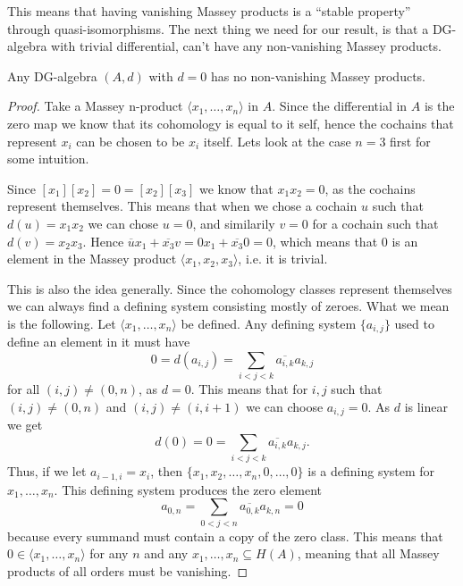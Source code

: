 This means that having vanishing Massey products is a ``stable property'' through quasi-isomorphisms. The next thing we need for our result, is that a DG-algebra with trivial differential, can't have any non-vanishing Massey products. 

\begin{lemma}
\label{lm:trivial_differential_then_no_massey}
Any DG-algebra $(A, d)$ with $d=0$ has no non-vanishing Massey products.
\end{lemma}

\begin{proof}
Take a Massey n-product $\langle x_1, \ldots, x_n\rangle$ in $A$. Since the differential in $A$ is the zero map we know that its cohomology is equal to it self, hence the cochains that represent $x_i$ can be chosen to be $x_i$ itself. Lets look at the case $n=3$ first for some intuition. 

Since $[x_1][x_2]=0=[x_2][x_3]$ we know that $x_1 x_2 =0$, as the cochains represent themselves. This means that when we chose a cochain $u$ such that $d(u)=x_1 x_2$ we can chose $u=0$, and similarily $v=0$ for a cochain such that $d(v)=x_2 x_3$. Hence $\overline{u}x_1+\overline{x_3}v = 0x_1+\overline{x_3}0=0$, which means that $0$ is an element in the Massey product $\langle x_1, x_2, x_3\rangle$, i.e. it is trivial. 

This is also the idea generally. Since the cohomology classes represent themselves we can always find a defining system consisting mostly of zeroes. What we mean is the following. Let $\langle x_1, \ldots, x_n\rangle$ be defined. Any defining system $\{a_{i,j}\}$ used to define an element in it must have 
\begin{equation*}
    0 = d(a_{i,j}) = \sum_{i<j<k}\overline{a_{i,k}} a_{k,j}
\end{equation*}
for all $(i,j)\neq (0,n)$, as $d=0$. This means that for $i,j$ such that $(i,j)\neq (0,n)$ and $(i,j)\neq (i,i+1)$ we can choose $a_{i,j} = 0$. As $d$ is linear we get
\begin{equation*}
    d(0)=0=\sum_{i<j<k}\overline{a_{i,k}} a_{k,j}.
\end{equation*}
Thus, if we let $a_{i-1, i} = x_i$, then $\{ x_1, x_2,\ldots, x_n, 0, \ldots, 0 \}$ is a defining system for $x_1, \ldots, x_n$. This defining system produces the zero element
\begin{equation*}
    a_{0,n} = \sum_{0<j<n}\overline{a_{0,k}} a_{k,n} = 0
\end{equation*}
because every summand must contain a copy of the zero class. This means that $0\in \langle x_1, \ldots, x_n\rangle$ for any $n$ and any $x_1, \ldots, x_n \subseteq H(A)$, meaning that all Massey products of all orders must be vanishing.
\end{proof}

